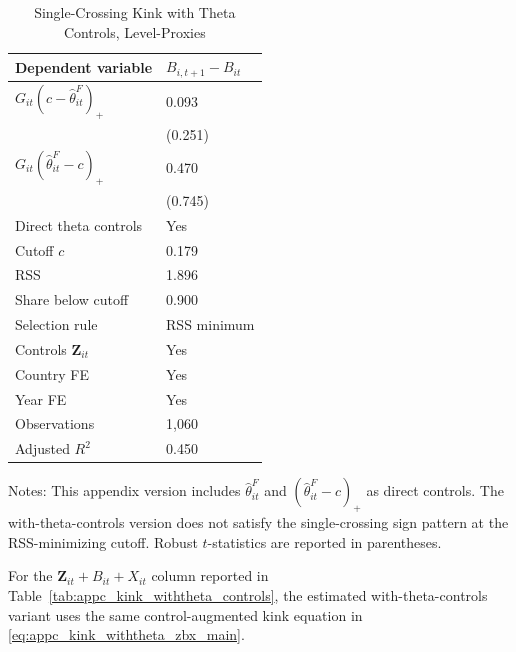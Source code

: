 \begin{table}[H]\centering
\begin{threeparttable}
\caption{Single-Crossing Kink with Theta Controls, Level-Proxies}
\label{tab:appc_kink_withtheta_main}
\scriptsize
\setlength{\tabcolsep}{3.0pt}
\begin{tabularx}{0.78\textwidth}{lY}
\toprule
Dependent variable & $B_{i,t+1}-B_{it}$ \\
\midrule
$G_{it}(c-\widehat\theta^F_{it})_+$ & 0.093 \\
 & (0.251) \\
$G_{it}(\widehat\theta^F_{it}-c)_+$ & 0.470 \\
 & (0.745) \\
\midrule
Direct theta controls & Yes \\
Cutoff $c$ & 0.179 \\
RSS & 1.896 \\
Share below cutoff & 0.900 \\
Selection rule & RSS minimum \\
Controls $\mathbf{Z}_{it}$ & Yes \\
Country FE & Yes \\
Year FE & Yes \\
Observations & 1,060 \\
Adjusted $R^2$ & 0.450 \\
\bottomrule
\end{tabularx}
\begin{tablenotes}[flushleft]\footnotesize
\item Notes: This appendix version includes $\widehat{\theta}^{F}_{it}$ and $(\widehat{\theta}^{F}_{it}-c)_+$ as direct controls. The with-theta-controls version does not satisfy the single-crossing sign pattern at the RSS-minimizing cutoff. Robust $t$-statistics are reported in parentheses.
\end{tablenotes}
\end{threeparttable}
\end{table}

For the $\mathbf{Z}_{it}+B_{it}+X_{it}$ column reported in Table~\ref{tab:appc_kink_withtheta_controls}, the estimated with-theta-controls variant uses the same control-augmented kink equation in \eqref{eq:appc_kink_withtheta_zbx_main}.

